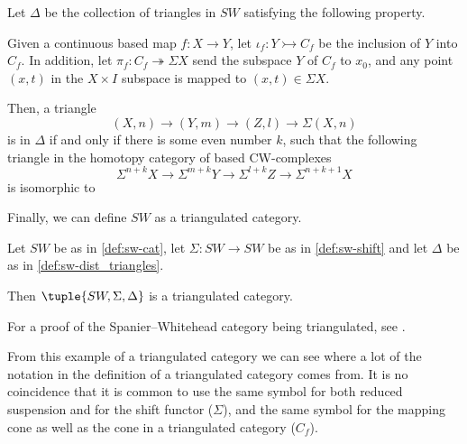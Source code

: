 \begin{definition}
    \label{def:sw-dist_triangles}
    Let \( \Delta \) be the collection of triangles in \( SW \) satisfying the following property.

    Given a continuous based map \( f: X \to Y \), let \( \iota_f: Y \rightarrowtail C_f \) be the inclusion of \( Y \) into \( C_f \). In addition, let \( \pi_f: C_f \twoheadrightarrow \Sigma X \) send the subspace \( Y \) of \( C_f \) to \( x_0 \), and any point \( (x, t) \) in the \( X \times I \) subspace is mapped to \( (x, t) \in \Sigma X \).
    
    Then, a triangle
    \[
        (X, n) \to (Y, m) \to (Z, l) \to \Sigma (X, n)
    \]
    is in \( \Delta \) if and only if there is some even number \( k \), such that the following triangle in the homotopy category of based CW-complexes
    \[
        \Sigma^{n + k} X \to \Sigma^{m + k} Y \to \Sigma^{l + k} Z \to \Sigma^{n + k + 1} X
    \]
    is isomorphic to
    \begin{center}
    \end{center}
    
\end{definition}

Finally, we can define \( SW \) as a triangulated category.

\begin{example}
    Let \( SW \) be as in \autoref{def:sw-cat}, let \( \Sigma: SW \to SW \) be as in \autoref{def:sw-shift} and let \( \Delta \) be as in \autoref{def:sw-dist_triangles}.

    Then \( \tuple{SW, \Sigma, \Delta} \) is a triangulated category.
\end{example}

For a proof of the Spanier--Whitehead category being triangulated, see \cite[Theorem 5.9]{Daria_Bachelor}.

From this example of a triangulated category we can see where a lot of the notation in the definition of a triangulated category comes from. It is no coincidence that it is common to use the same symbol for both reduced suspension and for the shift functor (\( \Sigma \)), and the same symbol for the mapping cone as well as the cone in a triangulated category (\( C_f \)).

